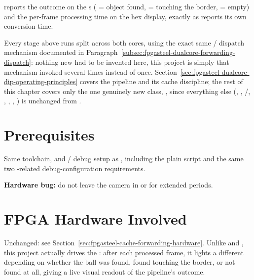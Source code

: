  reports the outcome on the s ( = object found,  = touching the border,  = empty) and the per-frame processing time on the hex display, exactly as  reports its own conversion time.

Every stage above runs split across both cores, using the exact same / dispatch mechanism documented in Paragraph~\ref{subsec:fpgasteel-dualcore-forwarding-dispatch}: nothing new had to be invented here, this project is simply that mechanism invoked several times instead of once. Section~\ref{sec:fpgasteel-dualcore-dip-operating-principles} covers the pipeline and its cache discipline; the rest of this chapter covers only the one genuinely new class, , since everything else (, , /, , , , ) is unchanged from .

\section{Prerequisites}
\label{sec:fpgasteel-dualcore-dip-prerequisites}

Same toolchain,  and / debug setup as , including the plain  script and the same two -related debug-configuration requirements.

\begin{warningbox}
\textbf{Hardware bug:} do not leave the camera in  or  for extended periods.\footnotemark
\end{warningbox}

\section{FPGA Hardware Involved}
\label{sec:fpgasteel-dualcore-dip-hardware}

Unchanged: see Section~\ref{sec:fpgasteel-cache-forwarding-hardware}. Unlike  and , this project actually drives the : after each processed frame, it lights a different  depending on whether the ball was found, found touching the border, or not found at all, giving a live visual readout of the pipeline's outcome.

